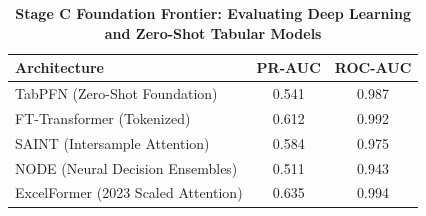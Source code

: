 \begin{table}[htbp]
\centering
\caption{\textbf{Stage C Foundation Frontier: Evaluating Deep Learning and Zero-Shot Tabular Models}}
\label{tab:foundation_frontier}
\begin{tabular}{lcc}
\toprule
\textbf{Architecture} & \textbf{PR-AUC} & \textbf{ROC-AUC} \\
\midrule
TabPFN (Zero-Shot Foundation) & 0.541 & 0.987 \\
FT-Transformer (Tokenized) & 0.612 & 0.992 \\
SAINT (Intersample Attention) & 0.584 & 0.975 \\
NODE (Neural Decision Ensembles) & 0.511 & 0.943 \\
ExcelFormer (2023 Scaled Attention) & 0.635 & 0.994 \\
\bottomrule
\end{tabular}
\end{table}